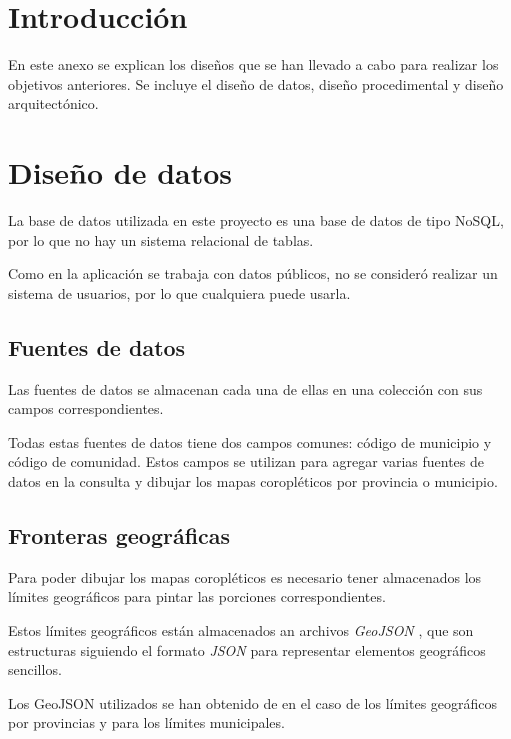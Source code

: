 
\section{Introducción}

En este anexo se explican los diseños que se han llevado a cabo para realizar los objetivos anteriores. Se incluye el diseño de datos, diseño procedimental y diseño arquitectónico.

\section{Diseño de datos}

La base de datos utilizada en este proyecto es una base de datos de tipo NoSQL, por lo que no hay un sistema relacional de tablas.

Como en la aplicación se trabaja con datos públicos, no se consideró realizar un sistema de usuarios, por lo que cualquiera puede usarla.

\subsection{Fuentes de datos}

Las fuentes de datos se almacenan cada una de ellas en una colección con sus campos correspondientes.

Todas estas fuentes de datos tiene dos campos comunes: código de municipio y código de comunidad. Estos campos se utilizan para agregar varias fuentes de datos en la consulta y dibujar los mapas coropléticos por provincia o municipio.

\subsection{Fronteras geográficas}

Para poder dibujar los mapas coropléticos es necesario tener almacenados los límites geográficos para pintar las porciones correspondientes.

Estos límites geográficos están almacenados an archivos \textit{GeoJSON} \cite{misc:geojson}, que son estructuras siguiendo el formato \textit{JSON} para representar elementos geográficos sencillos.

Los GeoJSON utilizados se han obtenido de \cite{misc:limitesmunicipales} en el caso de los límites geográficos por provincias y \cite{misc:carto} para los límites municipales.

